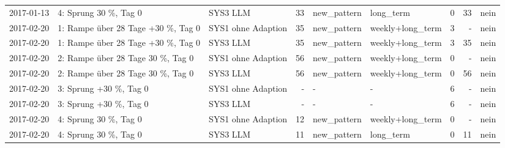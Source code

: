 \begin{tabular}{lllrllrrl}
2017-01-13 & 4: Sprung \textminus{}30 \%, Tag 0 & SYS3 LLM & 33 & new\_pattern & long\_term & 0 & 33 & nein \\
2017-02-20 & 1: Rampe über 28 Tage +30 \%, Tag 0 & SYS1 ohne Adaption & 35 & new\_pattern & weekly+long\_term & 3 & - & nein \\
2017-02-20 & 1: Rampe über 28 Tage +30 \%, Tag 0 & SYS3 LLM & 35 & new\_pattern & weekly+long\_term & 3 & 35 & nein \\
2017-02-20 & 2: Rampe über 28 Tage \textminus{}30 \%, Tag 0 & SYS1 ohne Adaption & 56 & new\_pattern & weekly+long\_term & 0 & - & nein \\
2017-02-20 & 2: Rampe über 28 Tage \textminus{}30 \%, Tag 0 & SYS3 LLM & 56 & new\_pattern & weekly+long\_term & 0 & 56 & nein \\
2017-02-20 & 3: Sprung +30 \%, Tag 0 & SYS1 ohne Adaption & - & - & - & 6 & - & nein \\
2017-02-20 & 3: Sprung +30 \%, Tag 0 & SYS3 LLM & - & - & - & 6 & - & nein \\
2017-02-20 & 4: Sprung \textminus{}30 \%, Tag 0 & SYS1 ohne Adaption & 12 & new\_pattern & weekly+long\_term & 0 & - & nein \\
2017-02-20 & 4: Sprung \textminus{}30 \%, Tag 0 & SYS3 LLM & 11 & new\_pattern & long\_term & 0 & 11 & nein \\
\bottomrule
\end{tabular}
